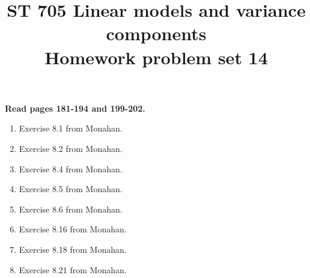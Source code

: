 \documentclass[11pt]{article}
\title{ST 705 Linear models and variance components \\ 
        Homework problem set 14}
\begin{document}
\maketitle

{\bf Read pages 181-194 and 199-202.}

\begin{enumerate}

\item Exercise 8.1 from Monahan.

\item Exercise 8.2 from Monahan.

\item Exercise 8.4 from Monahan.

\item Exercise 8.5 from Monahan.

\item Exercise 8.6 from Monahan.

\item Exercise 8.16 from Monahan.

\item Exercise 8.18 from Monahan.

\item Exercise 8.21 from Monahan.





\end{enumerate}
\end{document}
